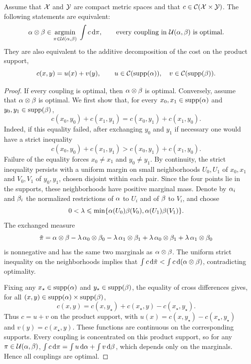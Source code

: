 \begin{prop}\label{prop-product-coupling-degenerate}
	Assume that $\mathcal{X}$ and $\mathcal{Y}$ are compact metric spaces and that $c\in\mathcal{C}(\mathcal{X}\times\mathcal{Y})$. The following statements are equivalent:
	\[
		\alpha\otimes\beta\in\underset{\pi\in\mathcal{U}(\alpha,\beta)}{\operatorname{argmin}}\;\int c\,\mathrm{d}\pi,
		\qquad
		\text{every coupling in }\mathcal{U}(\alpha,\beta)\text{ is optimal}.
	\]
	They are also equivalent to the additive decomposition of the cost on the product support,
	\[
		c(x,y)=u(x)+v(y),
		\qquad
		u\in\mathcal{C}(\operatorname{supp}(\alpha)),\quad v\in\mathcal{C}(\operatorname{supp}(\beta)).
	\]
\end{prop}
\begin{proof}
	If every coupling is optimal, then $\alpha\otimes\beta$ is optimal. Conversely, assume that $\alpha\otimes\beta$ is optimal. We first show that, for every $x_0,x_1\in\operatorname{supp}(\alpha)$ and $y_0,y_1\in\operatorname{supp}(\beta)$,
	\[
		c(x_0,y_0)+c(x_1,y_1)
		=
		c(x_0,y_1)+c(x_1,y_0).
	\]
	Indeed, if this equality failed, after exchanging $y_0$ and $y_1$ if necessary one would have a strict inequality
	\[
		c(x_0,y_0)+c(x_1,y_1)
		>
		c(x_0,y_1)+c(x_1,y_0).
	\]
		Failure of the equality forces $x_0\neq x_1$ and $y_0\neq y_1$. By continuity, the strict inequality persists with a uniform margin on small neighborhoods $U_0,U_1$ of $x_0,x_1$ and $V_0,V_1$ of $y_0,y_1$, chosen disjoint within each pair. Since the four points lie in the supports, these neighborhoods have positive marginal mass. Denote by $\alpha_i$ and $\beta_i$ the normalized restrictions of $\alpha$ to $U_i$ and of $\beta$ to $V_i$, and choose
	\[
		0<\lambda\leqslant
		\min\{\alpha(U_0)\beta(V_0),\alpha(U_1)\beta(V_1)\}.
	\]
	The exchanged measure
	\[
		\tilde\pi
		=
		\alpha\otimes\beta
		-\lambda\,\alpha_0\otimes\beta_0
		-\lambda\,\alpha_1\otimes\beta_1
		+\lambda\,\alpha_0\otimes\beta_1
		+\lambda\,\alpha_1\otimes\beta_0
	\]
	is nonnegative and has the same two marginals as $\alpha\otimes\beta$. The uniform strict inequality on the neighborhoods implies that $\int c\,\mathrm{d}\tilde\pi<\int c\,\mathrm{d}(\alpha\otimes\beta)$, contradicting optimality.

	Fixing any $x_\star\in\operatorname{supp}(\alpha)$ and $y_\star\in\operatorname{supp}(\beta)$, the equality of cross differences gives, for all $(x,y)\in\operatorname{supp}(\alpha)\times\operatorname{supp}(\beta)$,
	\[
		c(x,y)=c(x,y_\star)+c(x_\star,y)-c(x_\star,y_\star).
	\]
		Thus $c=u+v$ on the product support, with $u(x)=c(x,y_\star)-c(x_\star,y_\star)$ and $v(y)=c(x_\star,y)$. These functions are continuous on the corresponding supports. Every coupling is concentrated on this product support, so for any $\pi\in\mathcal{U}(\alpha,\beta)$,
	\(\int c\,\mathrm{d}\pi = \int u\,\mathrm{d}\alpha+\int v\,\mathrm{d}\beta\),
	which depends only on the marginals. Hence all couplings are optimal.
\end{proof}

